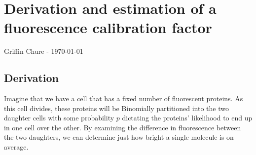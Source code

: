 \section*{Derivation and estimation of a fluorescence calibration factor}
Griffin Chure - \today


\subsection*{Derivation}

\hspace{10mm} Imagine that we have a cell that has a fixed number of fluorescent proteins.
As this cell divides, these proteins will be Binomially partitioned into the
two daughter cells with some probability $p$ dictating the proteins' likelihood
to end up in one cell over the other. By examining the difference in
fluorescence between the two daughters, we can determine just how bright a
single molecule is on average.

